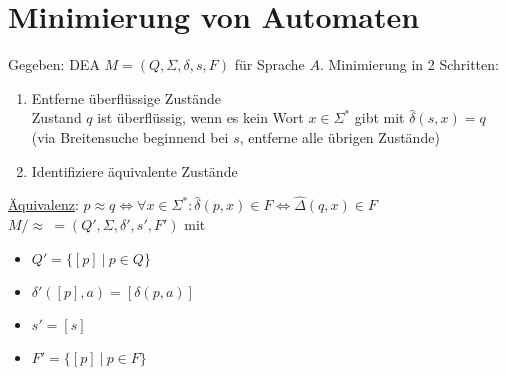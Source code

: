 \documentclass[a4paper]{article}
\newcommand{\ul}{\underline}
\begin{document}
\section{Minimierung von Automaten}
Gegeben: DEA $M=(Q,\Sigma,\delta,s,F)$ für Sprache $A$. Minimierung in 2 Schritten:
\begin{enumerate}[(1)]
	\item Entferne überflüssige Zustände\\
	Zustand $q$ ist überflüssig, wenn es kein Wort $x\in\Sigma^*$ gibt mit $\hat\delta(s,x)=q$ (via Breitensuche beginnend bei $s$, entferne alle übrigen Zustände)
	\item Identifiziere äquivalente Zustände
\end{enumerate}
\ul{Äquivalenz}: $p\approx q\Leftrightarrow\forall x\in\Sigma^*:\hat\delta(p,x)\in F\Leftrightarrow\hat\Delta(q,x)\in F$\\
$M/\approx\ =(Q',\Sigma,\delta',s',F')$ mit
\begin{itemize}
	\item $Q'=\{\left[p\right]\ \vert\ p\in Q\}$
	\item $\delta'(\left[p\right],a)=\left[\delta(p,a)\right]$
	\item $s'=\left[s\right]$
	\item $F'=\{\left[p\right]\ \vert\ p\in F\}$
\end{itemize}
\end{document}
